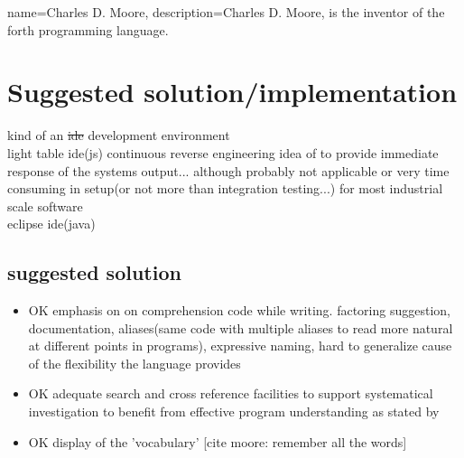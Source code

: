 {
  name={Charles D. Moore},
  description={Charles D. Moore, is the inventor of the forth programming language.}
}

\chapter{Suggested solution/implementation}

kind of an \sout{ide} development environment\\
light table ide(js) continuous reverse engineering idea of \cite{Muller:2000:RER:336512.336526} to provide immediate response of the systems output... although probably not applicable or very time consuming in setup(or not more than integration testing...) for most industrial scale software\\
eclipse ide(java)

\section{suggested solution}

\begin{itemize}

\item OK emphasis on on comprehension code while writing. factoring suggestion, documentation, aliases(same code with multiple aliases to read more natural at different points in programs),  expressive naming, hard to generalize cause of the flexibility the language provides

\item OK adequate search and cross reference facilities to support systematical investigation to benefit from effective program understanding as stated by \cite{Robillard:2004:EDI:1042203.1042417}

\item OK display of the 'vocabulary' [cite moore: remember all the words]

\end{itemize}

